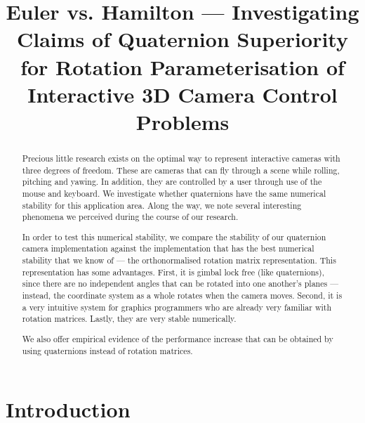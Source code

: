 \documentclass{acm_proc_article-sp}
\title{Euler vs. Hamilton --- Investigating Claims of Quaternion Superiority for Rotation Parameterisation of Interactive 3D Camera Control Problems}
\author{}
\date{}
\begin{document}
\maketitle

\begin{abstract}
Precious little research exists on the optimal way to represent interactive cameras with three degrees of freedom.
These are cameras that can fly through a scene while rolling, pitching and yawing.
In addition, they are controlled by a user through use of the mouse and keyboard.
We investigate whether quaternions have the same numerical stability for this application area.
Along the way, we note several interesting phenomena we perceived during the course of our research.

In order to test this numerical stability, we compare the stability of our quaternion camera implementation against the implementation that has the best numerical stability that we know of --- the orthonormalised rotation matrix representation.
This representation has some advantages.
First, it is gimbal lock free (like quaternions), since there are no independent angles that can be rotated into one another's planes --- instead, the coordinate system as a whole rotates when the camera moves.
Second, it is a very intuitive system for graphics programmers who are already very familiar with rotation matrices.
Lastly, they are very stable numerically.

We also offer empirical evidence of the performance increase that can be obtained by using quaternions instead of rotation matrices.

\end{abstract}



\section{Introduction}
\end{document}
